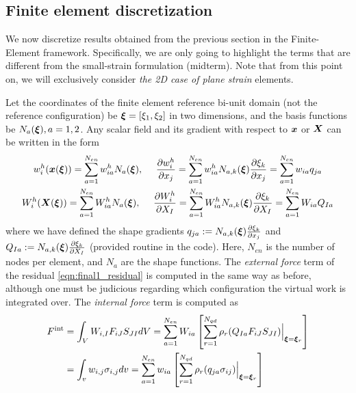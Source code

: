 \subsection{Finite element discretization}
We now discretize results obtained from the previous section in the Finite-Element framework.
Specifically, we are only going to highlight the terms that are different from the small-strain formulation (midterm).
Note that from this point on, we will exclusively consider \emph{the 2D case of plane strain} elements. 

Let the coordinates of the finite element reference bi-unit domain (not the reference configuration) be $\bm{\xi} = [\xi_1, \xi_2]$ in two dimensions, and the basis functions be $N_a (\bm{\xi}), a=1,2$.
Any scalar field and its gradient with respect to $\bm{x}$ or $\bm{X}$ can be written in the form
\begin{equation}
\begin{gathered}
    w_i^h(\bm{x}(\bm{\xi})) = \sum_{a=1}^{N_{en}} w_{ia}^h N_a(\bm{\xi}), ~~~~ \frac{\partial w_i^h}{\partial x_j} = \sum_{a=1}^{N_{en}} w_{ia}^h  N_{a,k}(\bm{\xi}) \frac{\partial \xi_k}{\partial x_j} = \sum_{a=1}^{N_{en}} w_{ia}  q_{ja} \\
    W_i^h(\bm{X}(\bm{\xi})) = \sum_{a=1}^{N_{en}} W_{ia}^h N_a(\bm{\xi}), ~~~~ \frac{\partial W_i^h}{\partial X_I} = \sum_{a=1}^{N_{en}} W_{ia}^h  N_{a,k}(\bm{\xi}) \frac{\partial \xi_k}{\partial X_I} = \sum_{a=1}^{N_{en}} W_{ia}  Q_{Ia} \\
\end{gathered}
\end{equation}
where we have defined the shape gradients $q_{ja} := N_{a,k}(\bm{\xi}) \frac{\partial \xi_k}{\partial x_j}$ and $Q_{Ia} := N_{a,k}(\bm{\xi}) \frac{\partial \xi_k}{\partial X_I}$ (provided routine \href{https://github.com/sy-cui/CSE552-FA2024/blob/main/final/part1/utility/shpg_2d.m}{} in the code).
Here, $N_{en}$ is the number of nodes per element, and $N_a$ are the shape functions.
The \emph{external force} term of the residual \cref{eqn:final1_residual} is computed in the same way as before, although one must be judicious regarding which configuration the virtual work is integrated over.  
The \emph{internal force} term is computed as
\begin{equation}\label{eqn:final1_fint}
\begin{aligned}
    F^{\textrm{int}} &= \int_V W_{i,I} F_{iJ} S_{JI} dV = \sum_{a=1}^{N_{en}} W_{ia} \left[\sum_{r=1}^{N_{qd}}  \rho_r (Q_{Ia} F_{iJ} S_{JI})\Big|_{\bm{\xi} = \bm{\xi}_r} \right] \\
    &= \int_v w_{i,j} \sigma_{i,j} dv = \sum_{a=1}^{N_{en}} w_{ia} \left[\sum_{r=1}^{N_{qd}}  \rho_r (q_{ja} \sigma_{ij})\Big|_{\bm{\xi} = \bm{\xi}_r} \right]
\end{aligned}
\end{equation}
